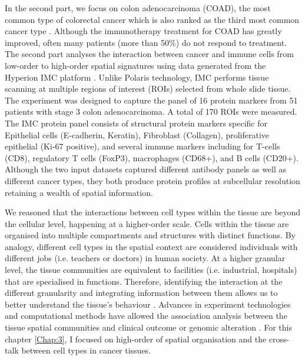 In the second part, we focus on colon adenocarcinoma (COAD), the most common type of colorectal cancer which is also ranked as the third most common cancer type \cite{wang2022identification, siegel2021cancer}. Although the immunotherapy treatment for COAD has greatly improved, often many patients (more than 50\%) do not respond to treatment. The second part analyses the interaction between cancer and immune cells from low-order to high-order spatial signatures using data generated from the Hyperion IMC platform \cite{giesen2014IMC}. Unlike Polaris technology, IMC performs tissue scanning at multiple regions of interest (ROIs) selected from whole slide tissue. The experiment was designed to capture the panel of 16 protein markers from 51 patients with stage 3 colon adenocarcinoma. A total of 170 ROIs were measured. The IMC protein panel consists of structural protein markers specific for Epithelial cells (E-cadherin, Keratin), Fibroblast (Collagen), proliferative epithelial (Ki-67 positive), and several immune markers including for T-cells (CD8), regulatory T cells (FoxP3), macrophages (CD68+), and B cells (CD20+).  Although the two input datasets captured different antibody panels as well as different cancer types, they both produce protein profiles at subcellular resolution retaining a wealth of spatial information.    

We reasoned that the interactions between cell types within the tissue are beyond the cellular level, happening at a higher-order scale. Cells within the tissue are organised into multiple compartments and structures with distinct functions. By analogy, different cell types in the spatial context are considered individuals with different jobs (i.e. teachers or doctors) in human society. At a higher granular level, the tissue communities are equivalent to facilities (i.e. industrial, hospitals) that are specialised in functions. Therefore, identifying the interaction at the different granularity and integrating information between them allows us to better understand the tissue's behaviour \cite{schurch2020coordinated}. Advances in experiment technologies and computational methods have allowed the association analysis between the tissue spatial communities and clinical outcome or genomic alteration \cite{schurch2020coordinated, danenberg2022breast}. For this chapter \ref{Chap:3}, I focused on high-order of spatial organisation and the cross-talk between cell types in cancer tissues.

